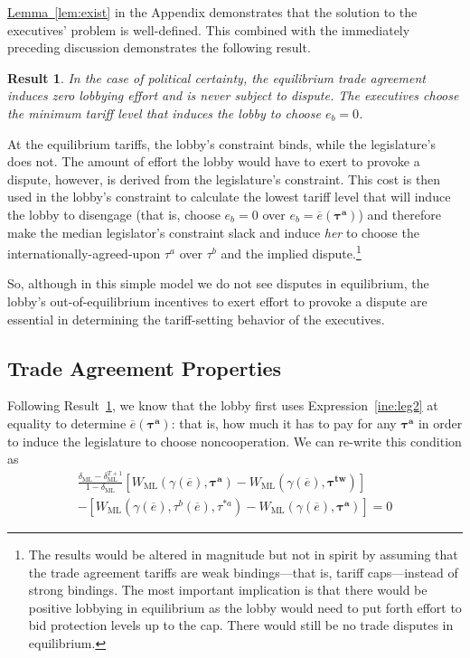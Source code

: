 \documentclass[authoryear, review]{elsarticle}
\newtheorem{result}{Result}
\newcommand{\ov}{\overline}
\newcommand{\bta}{\bm{\tau^a}}
\newcommand{\ga}{\gamma}
\newcommand{\btw}{\bm{\tau^{tw}}}
\newcommand{\de}{\delta}
\begin{document}
\hyperlink{Lem3}{Lemma~\ref{lem:exist}} in the Appendix demonstrates that the solution to the executives' problem is well-defined. This combined with the immediately preceding discussion demonstrates the following result.
\begin{result}
  In the case of political certainty, the equilibrium trade agreement induces zero lobbying effort and is never subject to dispute. The executives choose the minimum tariff level that induces the lobby to choose $e_b=0$.
  \label{res:eqm}
\end{result}
At the equilibrium tariffs, the lobby's constraint binds, while the legislature's does not. The amount of effort the lobby would have to exert to provoke a dispute, however, is derived from the legislature's constraint. This cost is then used in the lobby's constraint to calculate the lowest tariff level that will induce the lobby to disengage (that is, choose $e_b =0$ over $e_b=\ov{e}(\bta)$) and therefore make the median legislator's constraint slack and induce \textit{her} to choose the internationally-agreed-upon $\tau^a$ over $\tau^b$ and the implied dispute.\footnote{The results would be altered in magnitude but not in spirit by assuming that the trade agreement tariffs are weak bindings---that is, tariff caps---instead of strong bindings. The most important implication is that there would be positive lobbying in equilibrium as the lobby would need to put forth effort to bid protection levels up to the cap. There would still be no trade disputes in equilibrium.}

So, although in this simple model we do not see disputes in equilibrium, the lobby's out-of-equilibrium incentives to exert effort to provoke a dispute are essential in determining the tariff-setting behavior of the executives.

\subsection{Trade Agreement Properties}
Following Result~\ref{res:eqm}, we know that the lobby first uses Expression~\ref{ine:leg2} at equality to determine $\ov{e}(\bta)$: that is, how much it has to pay for any $\bta$ in order to induce the legislature to choose noncooperation. We can re-write this condition as
\begin{multline}
  \frac{\de_\text{ML} - \de_\text{ML}^{T+1}}{1-\de_\text{ML}} \left[W_\text{ML}(\ga(\ov{e}),\bta) - W_\text{ML}(\ga(\ov{e}),\btw) \right] \\
	- \left[ W_\text{ML}(\ga(\ov{e}),\tau^b(\ov{e}),\tau^{*a}) - W_\text{ML}(\ga(\ov{e}),\bta) \right] = 0
  \label{eq:leg2}
\end{multline}
\end{document}
